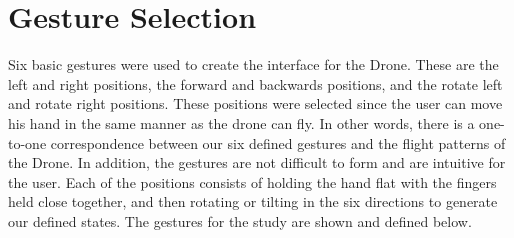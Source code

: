 \documentclass[letterpaper,english, 12pt]{article}
\begin{document}
\section*{Gesture Selection}

Six basic gestures were used to create the interface for the Drone. These are the left and right positions, the forward and backwards positions, and the rotate left and rotate right positions. These positions were selected since the user can move his hand in the same manner as the drone can fly. In other words, there is a one-to-one correspondence between our six defined gestures and the flight patterns of the Drone. In addition, the gestures are not difficult to form and are intuitive for the user.  Each of the positions consists of holding the hand flat with the fingers held close together, and then rotating or tilting in the six directions to generate our defined states. The gestures for the study are shown and defined below.
\end{document}
